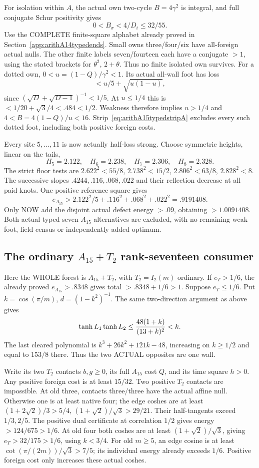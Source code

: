 For isolation within \(A\), the actual
own two-cycle \(B=4\gamma^2\) is integral,
and full conjugate Schur positivity gives
\[
                         0<B_\sigma<4/D_i\le32/55 .
\]
Use the COMPLETE finite-square alphabet
already proved in
Section~\ref{app:arithA14typedends}.
Small owns three/four/six have all-foreign
actual nulls.
The other finite labels seven/fourteen
each have a conjugate \(>1\), using
the stated brackets for \(\theta^2\),
\(2+\theta\).
Thus no finite isolated own survives.
For a dotted own, \(0<u=(1-Q)/\gamma^2<1\).
Its actual all-wall foot has loss
\[
                  <u/5+\sqrt{u(1-u)},
\]
since \((\sqrt D+\sqrt{D-1})^{-1}<1/5\).
At \(u\le1/4\) this is
\(<1/20+\sqrt3/4<.484<1/2\).
Weakness therefore implies \(u>1/4\)
and \(4<B=4(1-Q)/u<16\).
Strip~\eqref{eq:arithA15typedstripA}
excludes every such dotted foot, including
both positive foreign costs.

Every site \(5,\ldots,11\) is now actually
half-loss strong.
Choose symmetric heights, linear on the tails,
\[
           H_5=2.122,\quad H_6=2.238,\quad
           H_7=2.306,\quad H_8=2.328 .
\]
The strict floor tests are
\(2.622^2<55/8\), \(2.738^2<15/2\),
\(2.806^2<63/8\), \(2.828^2<8\).
The successive slopes
\(.4244,.116,.068,.022\) and their
reflection decrease at all paid knots.
One positive reference square gives
\[
        e_{A_{15}}>2.122^2/5+.116^2+.068^2+.022^2=.9191408 .
\]
Only NOW add the disjoint actual defect
energy \(>.09\), obtaining \(>1.0091408\).
Both actual typed-seven \(A_{15}\) alternatives
are excluded, with no remaining weak foot,
field census or independently added optimum.

\subsection{The ordinary \(A_{15}+T_2\) rank-seventeen consumer}
\label{app:arithA15ordinary}

Here the WHOLE forest is \(A_{15}+T_2\),
with \(T_2=I_2(m)\) ordinary.
If \(e_T>1/6\), the already proved
\(e_{A_{15}}>.8348\) gives total
\(>.8348+1/6>1\).
Suppose \(e_T\le1/6\).
Put \(k=\cos(\pi/m)\), \(d=(1-k^2)^{-1}\).
The same two-direction argument as above gives
\[
               \tanh L_1\tanh L_2
                  \le{48(1+k)\over(13+k)^2}<k .
\]
The last cleared polynomial is
\(k^3+26k^2+121k-48\), increasing on
\(k\ge1/2\) and equal to \(153/8\) there.
Thus the two ACTUAL opposites are one wall.

Write its two \(T_2\) contacts \(b,g\ge0\),
its full \(A_{15}\) cost \(Q\), and
its time square \(h>0\).
Any positive foreign cost is at least
\(15/32\).
Two positive \(T_2\) contacts are impossible.
At old three, contacts three/three have
the actual affine null.
Otherwise one is at least native four;
the edge coshes are at least
\((1+2\sqrt2)/3>5/4\),
\((1+\sqrt2)/\sqrt3>29/21\).
Their half-tangents exceed \(1/3,2/5\).
The positive dual certificate at correlation
\(1/2\) gives energy \(>124/675>1/6\).
At old four both coshes are at least
\((1+\sqrt2)/\sqrt3\), giving
\(e_T>32/175>1/6\), using \(k<3/4\).
For old \(m\ge5\), an edge cosine is at
least \(\cot(\pi/(2m))/\sqrt3>7/5\);
its individual energy already exceeds \(1/6\).
Positive foreign cost only increases these
actual coshes.

